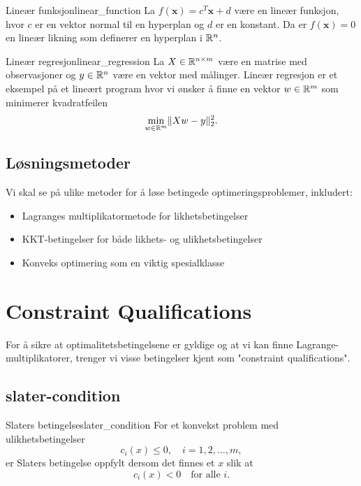 \begin{example}{Lineær funksjon}{linear_function}
	La \(f(\symbf{x}) = c^T\symbf{x} + d\) være en lineær funksjon, hvor \(c\) er en vektor normal til en hyperplan og \(d\) er en konstant.
	Da er \(f(\symbf{x}) = 0\) en lineær likning som definerer en hyperplan i \(\mathbb{R}^n\).
\end{example}

\begin{example}{Lineær regresjon}{linear_regression}
	La \(X \in \mathbb{R}^{n \times m}\) være en matrise med observasjoner og \(y \in \mathbb{R}^n\) være en vektor med målinger.
	Lineær regresjon er et eksempel på et lineært program hvor vi ønsker å finne en vektor \(w \in \mathbb{R}^m\) som minimerer kvadratfeilen
	\begin{equation*}
		\min_{w \in \mathbb{R}^m} \lVert Xw - y\rVert_2^2.
	\end{equation*}
\end{example}

\section{Løsningsmetoder}

Vi skal se på ulike metoder for å løse betingede optimeringsproblemer, inkludert:
\begin{itemize}
	\item Lagranges multiplikatormetode for likhetsbetingelser
	\item KKT-betingelser for både likhets- og ulikhetsbetingelser
	\item Konveks optimering som en viktig spesialklasse
\end{itemize}


\chapter{Constraint Qualifications}

For å sikre at optimalitetsbetingelsene er gyldige og at vi kan finne Lagrange-multiplikatorer, trenger vi visse betingelser kjent som "constraint qualifications".

\section[Slaters betingelse]{\gls{slater-condition}}

\begin{definition}[breakable]{Slaters betingelse}{slater_condition}
	For et konvekst problem med ulikhetsbetingelser
	\[
		c_i(x) \le 0,\quad i=1,2,\dots,m,
	\]
	er Slaters betingelse oppfylt dersom det finnes et \(x\) slik at
	\[
		c_i(x) < 0 \quad \text{for alle } i.
	\]
\end{definition}

